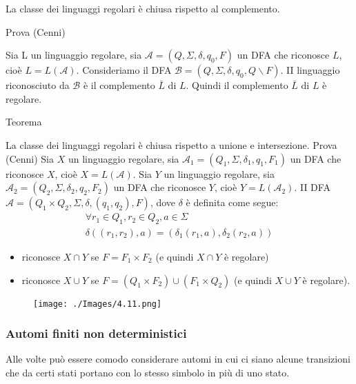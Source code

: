 La classe dei linguaggi regolari è chiusa rispetto al complemento.

Prova (Cenni) 

Sia L un linguaggio regolare, sia $\mathcal{A}=\left(Q, \Sigma, \delta, q_{0}, F\right)$ un DFA che riconosce $L$, cioè $L=L(\mathcal{A})$. Consideriamo il DFA $\mathcal{B}=\left(Q, \Sigma, \delta, q_{0}, Q \backslash F\right)$. II linguaggio riconosciuto da $\mathcal{B}$ è il complemento $\bar{L}$ di $L$. Quindi il complemento $\bar{L}$ di $L$ è regolare.

\vspace{5mm}

Teorema

La classe dei linguaggi regolari è chiusa rispetto a unione e intersezione.
Prova (Cenni) Sia $X$ un linguaggio regolare, sia
$\mathcal{A}_{1}=\left(Q_{1}, \Sigma, \delta_{1}, q_{1}, F_{1}\right)$ un DFA che riconosce $X$, cioè $X=L(\mathcal{A})$.
Sia $Y$ un linguaggio regolare, sia $\mathcal{A}_{2}=\left(Q_{2}, \Sigma, \delta_{2}, q_{2}, F_{2}\right)$ un DFA che riconosce $Y$, cioè $Y=L\left(\mathcal{A}_{2}\right)$.
II DFA $\mathcal{A}=\left(Q_{1} \times Q_{2}, \Sigma, \delta,\left(q_{1}, q_{2}\right), F\right)$, dove $\delta$ è definita come segue:
$$
\begin{gathered}
\forall r_{1} \in Q_{1}, r_{2} \in Q_{2}, a \in \Sigma \\
\delta\left(\left(r_{1}, r_{2}\right), a\right)=\left(\delta_{1}\left(r_{1}, a\right), \delta_{2}\left(r_{2}, a\right)\right)
\end{gathered}
$$
\begin{itemize}
    \item riconosce $X \cap Y$ se $F=F_{1} \times F_{2}$ (e quindi $X \cap Y$ è regolare)
    \item riconosce $X \cup Y$ se $F=\left(Q_{1} \times F_{2}\right) \cup\left(F_{1} \times Q_{2}\right)$ (e quindi $X \cup Y$ è regolare).

\end{itemize}

\begin{figure}[hbpt!]
    \centering
    \texttt{[image: ./Images/4.11.png]}
\end{figure}
\FloatBarrier

\subsubsection{Automi finiti non deterministici}

Alle volte può essere comodo considerare automi in cui ci siano
alcune transizioni che da certi stati portano con lo stesso simbolo
in più di uno stato.

